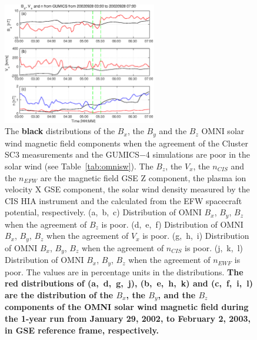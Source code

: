 \documentclass[linenumbers,draft]{agujournal}
\begin{document}
\begin{figure}[h]
\centering
\includegraphics[width=0.6\textwidth,angle=0]{swe-2021-corr-f13}  
\caption{The \textbf{black} distributions of the $B_{x}$, the $B_{y}$  and the $B_{z}$ OMNI solar wind magnetic field components when the agreement of the Cluster SC3 measurements and the GUMICS$-$4 simulations are poor in the solar wind (see Table~\ref{tab:omnisw}). The $B_{z}$, the $V_{x}$, the $n_{CIS}$ and the $n_{EFW}$ are the magnetic field GSE Z component, the plasma ion velocity X GSE component, the  solar wind density measured by the CIS HIA instrument and the calculated from the EFW spacecraft potential, respectively. (a,~b,~c) Distribution of OMNI $B_{x}$, $B_{y}$, $B_{z}$ when the agreement of $B_{z}$ is poor. (d,~e,~f) Distribution of OMNI  $B_{x}$, $B_{y}$, $B_{z}$ when the agreement of $V_{x}$ is poor. (g,~h,~i) Distribution of OMNI $B_{x}$, $B_{y}$, $B_{z}$ when the agreement of $n_{CIS}$ is poor. (j,~k,~l) Distribution of OMNI $B_{x}$, $B_{y}$, $B_{z}$ when the agreement of $n_{EWF}$ is poor. The values are in percentage units in the distributions. \textbf{The red distributions of (a,~d,~g,~j), (b,~e,~h,~k) and (c,~f,~i,~l) are the distribution of the $B_{x}$, the $B_{y}$, and the $B_{z}$ components of the OMNI solar wind magnetic field during the 1-year run from January 29, 2002, to February 2, 2003, in GSE reference frame, respectively.}} 
\label{fig:swomnibxyz}
\end{figure}

\pagebreak
\end{document}

